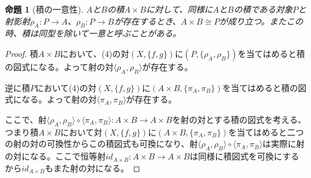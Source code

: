 \documentclass[dvipdfmx]{jsarticle}
\newcommand{\arrow}{\rightarrow}
\newcommand{\tuple}[1]{\langle #1\rangle}
\newcommand{\mor}[3]{#1:#2\arrow #3}
\newtheorem{proof}{証明}[section]
\newtheorem{prop}{命題}[section]
\begin{document}
	\begin{prop}[積の一意性]
		$A$と$B$の積$A\times B$に対して、同様に$A$と$B$の積である対象$P$と射影射$\mor{\rho_A}{P}{A}$、$\mor{\rho_B}{P}{B}$が存在するとき、$A\times B\cong P$が成り立つ。またこの時、積は同型を除いて一意と呼ぶことがある。
	\end{prop}
	\begin{proof}
		積$A\times B$において、(4)の対$(X,\{f,g\})$に$(P,\{\rho_A,\rho_B\})$を当てはめると積の図式になる。よって射の対$\tuple{\rho_A,\rho_B}$が存在する。

		逆に積$P$において(4)の対$(X,\{f,g\})$に$(A\times B,\{\pi_A,\pi_B\})$を当てはめると積の図式になる。よって射の対$\tuple{\pi_A,\pi_B}$が存在する。
		\begin{center}
		\end{center}
		ここで、射$\mor{\tuple{\rho_A,\rho_B}\circ\tuple{\pi_A,\pi_B}}{A\times B}{A\times B}$を射の対とする積の図式を考える、つまり積$A\times B$において対$(X,\{f,g\})$に$(A\times B,\{\pi_A,\pi_B\})$を当てはめると二つの射の対の可換性からこの積図式も可換になり、射$\tuple{\rho_A,\rho_B}\circ\tuple{\pi_A,\pi_B}$は実際に射の対になる。ここで恒等射$\mor{id_{A\times B}}{A\times B}{A\times B}$は同様に積図式を可換にするから$id_{A\times B}$もまた射の対になる。


\end{proof}
\end{document}
